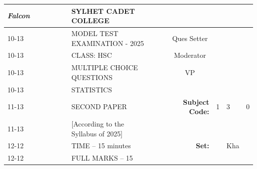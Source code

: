 \documentclass[12pt]{exam}
\begin{document}
\begin{table}[]
\begin{tabular}{lllllllllrlll}
\textit{Falcon} &  &  &  &  &  & \textbf{SYLHET CADET COLLEGE}       &  &                       & \multicolumn{1}{l}{}                        &                        &                        &                        \\ \cline{10-13} 
       &  &  &  &  &  & MODEL TEST EXAMINATION - 2025             &  & \multicolumn{1}{l|}{} & \multicolumn{1}{c|}{Ques Setter}            & \multicolumn{3}{l|}{}                                                    \\ \cline{10-13} 
       &  &  &  &  &  & CLASS: HSC                          &  & \multicolumn{1}{l|}{} & \multicolumn{1}{c|}{Moderator}              & \multicolumn{3}{l|}{}                                                    \\ \cline{10-13} 
       &  &  &  &  &  & MULTIPLE CHOICE QUESTIONS           &  & \multicolumn{1}{l|}{} & \multicolumn{1}{c|}{VP}                     & \multicolumn{3}{l|}{}                                                    \\ \cline{10-13} 
       &  &  &  &  &  & STATISTICS                          &  &                       &                                             &                        &                        &                        \\ \cline{11-13} 
       &  &  &  &  &  & SECOND PAPER                        &  &                       & \multicolumn{1}{r|}{\textbf{Subject Code:}} & \multicolumn{1}{l|}{1} & \multicolumn{1}{l|}{3} & \multicolumn{1}{l|}{0} \\ \cline{11-13} 
       &  &  &  &  &  & [According to the Syllabus of 2025] &  &                       &                                             &                        &                        &                        \\ \cline{12-12}
       &  &  &  &  &  & TIME – 15 minutes                   &  &                       & \textbf{Set:}                               & \multicolumn{1}{l|}{}  & \multicolumn{1}{l|}{Kha} &                        \\ \cline{12-12}
       &  &  &  &  &  & FULL MARKS – 15                     &  &                       & \multicolumn{1}{l}{}                        &                        &                        &                       
\end{tabular}
\end{table}
\end{document}
